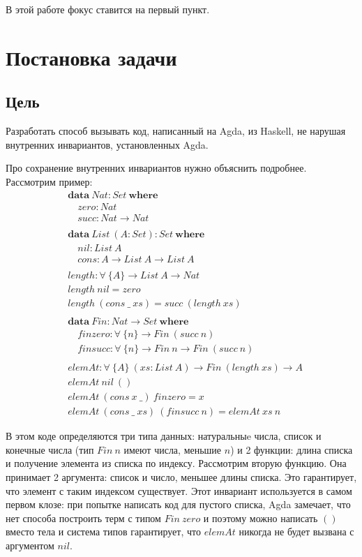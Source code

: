 В этой работе фокус ставится на первый пункт.

\newpage
\section{Постановка задачи}

\subsection{Цель}

Разработать способ вызывать код, написанный на Agda, из Haskell, не нарушая
внутренних инвариантов, установленных Agda.

Про сохранение внутренних инвариантов нужно объяснить подробнее. Рассмотрим пример:
\begin{align*}
&\mathbf{data}\ Nat : Set\ \mathbf{where}\\
&\quad zero : Nat\\
&\quad succ : Nat \rightarrow Nat\\
\\
&\mathbf{data}\ List\ (A : Set) : Set\ \mathbf{where}\\
&\quad nil : List\ A\\
&\quad cons : A \rightarrow List\ A \rightarrow List\ A\\
\\
&length : \forall\ \{A\} \rightarrow List\ A \rightarrow Nat\\
&length\ nil = zero\\
&length\ (cons\ \_\ xs) = succ\ (length\ xs)\\
\\
&\mathbf{data}\ Fin : Nat \rightarrow Set\ \mathbf{where}\\
&\quad finzero : \forall\ \{n\} \rightarrow Fin\ (succ\ n)\\
&\quad finsucc : \forall\ \{n\} \rightarrow Fin\ n \rightarrow Fin\ (succ\ n)\\
\\
&elemAt : \forall\ \{A\}\ (xs : List\ A) \rightarrow Fin\ (length\ xs) \rightarrow A\\
&elemAt\ nil\ ()\\
&elemAt\ (cons\ x\ \_)\ finzero = x\\
&elemAt\ (cons\ \_\ xs)\ (finsucc\ n) = elemAt\ xs\ n
\end{align*}

В этом коде определяются три типа данных: натуральныe числа,
список и конечные числа (тип \(Fin\ n\) имеют числа, меньшие \(n\)) и
2 функции: длина списка и получение элемента из списка по индексу.
Рассмотрим вторую функцию. Она принимает 2 аргумента: список и число,
меньшее длины списка. Это гарантирует, что элемент с таким индексом
существует. Этот инвариант используется в самом первом клозе:
при попытке написать код для пустого списка, Agda замечает, что нет способа
построить терм с типом \(Fin\ zero\) и поэтому можно написать \(()\) вместо тела
и система типов гарантирует, что \(elemAt\) никогда не будет вызвана с
аргументом \(nil\).

